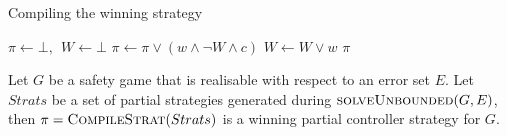 \begin{algorithm}[t]
   \caption{Compiling the  winning strategy}\label{alg:unboundedCompile}
   \begin{algorithmic}[1]
            \State $\pi \gets \bot,~~W \gets \bot$
            \State $\pi \gets \pi \lor (w \land \neg W \land c)$
                \State $W \gets W \lor w$
            \EndFor
            \State \Return $\pi$
        \EndFunction
    \end{algorithmic}
\end{algorithm}

\begin{theorem}
    Let $G$ be a safety game that is realisable with respect to an error set $E$. Let $Strats$ be a set of partial strategies generated during $\textsc{solveUnbounded}(G, E)$, then $\pi = \textsc{CompileStrat}(Strats)$ is a winning partial controller strategy for $G$.
\end{theorem}
